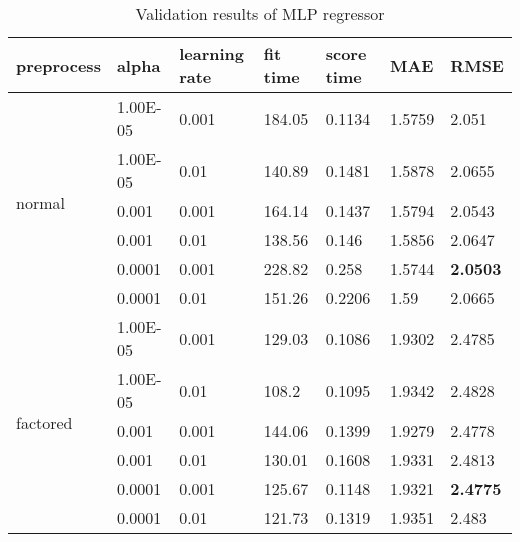 \begin{table}[H]
    \centering
    \begin{tabular}{lll|llll}
    \toprule
    \textbf{preprocess}      & \textbf{alpha} & \textbf{learning rate} & \textbf{fit time} & \textbf{score time} & \textbf{MAE} & \textbf{RMSE}   \\ \midrule
    \multirow{6}{*}{normal}   & 1.00E-05 & 0.001 & 184.05 & 0.1134 & 1.5759 & 2.051  \\
                              & 1.00E-05 & 0.01  & 140.89 & 0.1481 & 1.5878 & 2.0655 \\
                              & 0.001    & 0.001 & 164.14 & 0.1437 & 1.5794 & 2.0543 \\
                              & 0.001    & 0.01  & 138.56 & 0.146  & 1.5856 & 2.0647 \\
                              & 0.0001   & 0.001 & 228.82 & 0.258  & 1.5744 & \textbf{2.0503} \\
                              & 0.0001   & 0.01  & 151.26 & 0.2206 & 1.59   & 2.0665 \\
                              \midrule
    \multirow{6}{*}{factored} & 1.00E-05 & 0.001 & 129.03 & 0.1086 & 1.9302 & 2.4785 \\
                              & 1.00E-05 & 0.01  & 108.2  & 0.1095 & 1.9342 & 2.4828 \\
                              & 0.001    & 0.001 & 144.06 & 0.1399 & 1.9279 & 2.4778 \\
                              & 0.001    & 0.01  & 130.01 & 0.1608 & 1.9331 & 2.4813 \\
                              & 0.0001   & 0.001 & 125.67 & 0.1148 & 1.9321 & \textbf{2.4775} \\
                              & 0.0001   & 0.01  & 121.73 & 0.1319 & 1.9351 & 2.483  \\
    \bottomrule
    \end{tabular}
    \caption{Validation results of MLP regressor}
    \label{tab:val_mlp}
    \end{table}